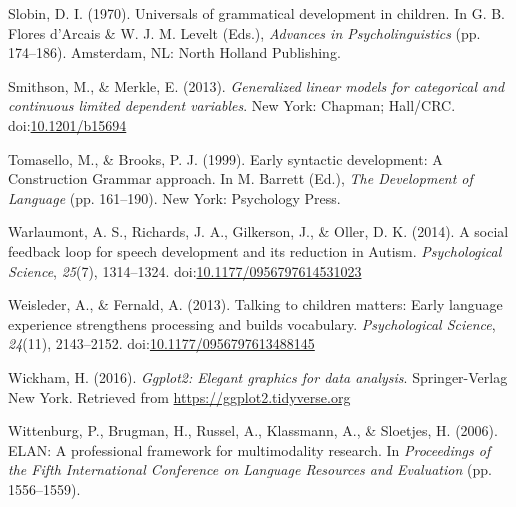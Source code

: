 \documentclass[,man,floatsintext]{apa6}
\begin{document}
\hypertarget{ref-slobin1970universals}{}
Slobin, D. I. (1970). Universals of grammatical development in children.
In G. B. Flores d'Arcais \& W. J. M. Levelt (Eds.), \emph{Advances in
Psycholinguistics} (pp. 174--186). Amsterdam, NL: North Holland
Publishing.

\hypertarget{ref-smithson2013generalized}{}
Smithson, M., \& Merkle, E. (2013). \emph{Generalized linear models for
categorical and continuous limited dependent variables}. New York:
Chapman; Hall/CRC.
doi:\href{https://doi.org/10.1201/b15694}{10.1201/b15694}

\hypertarget{ref-tomasello1999early}{}
Tomasello, M., \& Brooks, P. J. (1999). Early syntactic development: A
Construction Grammar approach. In M. Barrett (Ed.), \emph{The
Development of Language} (pp. 161--190). New York: Psychology Press.

\hypertarget{ref-warlaumont2014social}{}
Warlaumont, A. S., Richards, J. A., Gilkerson, J., \& Oller, D. K.
(2014). A social feedback loop for speech development and its reduction
in Autism. \emph{Psychological Science}, \emph{25}(7), 1314--1324.
doi:\href{https://doi.org/10.1177/0956797614531023}{10.1177/0956797614531023}

\hypertarget{ref-weisleder2013talking}{}
Weisleder, A., \& Fernald, A. (2013). Talking to children matters: Early
language experience strengthens processing and builds vocabulary.
\emph{Psychological Science}, \emph{24}(11), 2143--2152.
doi:\href{https://doi.org/10.1177/0956797613488145}{10.1177/0956797613488145}

\hypertarget{ref-R-ggplot2}{}
Wickham, H. (2016). \emph{Ggplot2: Elegant graphics for data analysis}.
Springer-Verlag New York. Retrieved from
\url{https://ggplot2.tidyverse.org}

\hypertarget{ref-ELAN}{}
Wittenburg, P., Brugman, H., Russel, A., Klassmann, A., \& Sloetjes, H.
(2006). ELAN: A professional framework for multimodality research. In
\emph{Proceedings of the Fifth International Conference on Language
Resources and Evaluation} (pp. 1556--1559).

\endgroup
\end{document}

